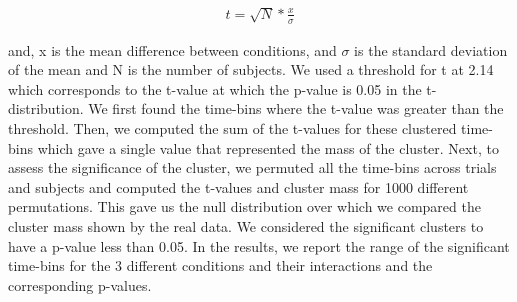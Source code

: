 \begin{gather*}\label{eq:cluster_permutation}
 t = \sqrt{N} * \frac{x}{\sigma}
 \end{gather*}

and, x is the mean difference between conditions, and $\sigma$ is the standard deviation of the mean and N is the number of subjects. We used a threshold for t at 2.14 which corresponds to the t-value at which the p-value is 0.05 in the t-distribution. We first found the time-bins where the t-value was greater than the threshold. Then, we computed the sum of the t-values for these clustered time-bins which gave a single value that represented the mass of the cluster. Next, to assess the significance of the cluster, we permuted all the time-bins across trials and subjects and computed the t-values and cluster mass for 1000 different permutations. This gave us the null distribution over which we compared the cluster mass shown by the real data. We considered the significant clusters to have a p-value less than 0.05. In the results, we report the range of the significant time-bins for the 3 different conditions and their interactions and the corresponding p-values. 
